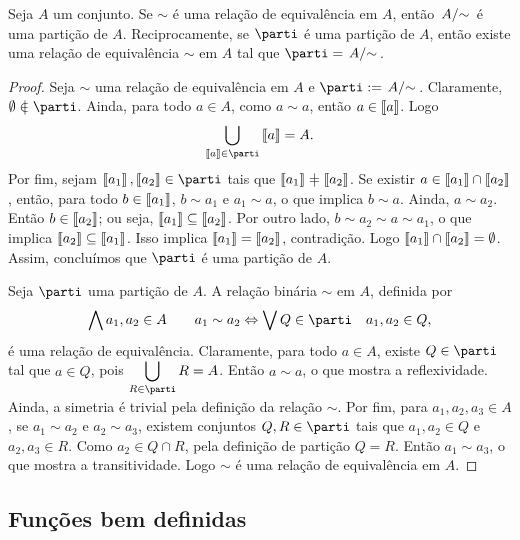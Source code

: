 \begin{theorem}
\label{conj:teo.rel.equiv.part}
	Seja $A$ um conjunto. Se $\sim$ é uma relação de equivalência em $A$, então $\quo{A}{\sim}$ é uma partição de $A$. Reciprocamente, se $\parti$ é uma partição de $A$, então existe uma relação de equivalência $\sim$ em $A$ tal que $\parti = \quo{A}{\sim}$.
\end{theorem}
\begin{proof}
Seja $\sim$ uma relação de equivalência em $A$ e $\parti := \quo{A}{\sim}$. Claramente, $\emptyset \notin \parti$. Ainda, para todo $a \in A$, como $a \sim a$, então $a \in \left\llbracket{a}\right\rrbracket$. Logo
	\begin{equation*}
	\bigcup_{\cla{a} \in \parti} \cla{a} = A.
	\end{equation*}
Por fim, sejam $\cla{a_1},\cla{a_2} \in \parti$ tais que $\cla{a_1} \neq \cla{a_2}$. Se existir $a \in \left\llbracket{a_1}\right\rrbracket \cap \left\llbracket{a_2}\right\rrbracket$, então, para todo $b \in \left\llbracket{a_1}\right\rrbracket$, $b \sim a_1$ e $a_1 \sim a$, o que implica $b \sim a$. Ainda, $a \sim a_2$. Então $b \in \left\llbracket{a_2}\right\rrbracket$; ou seja, $\left\llbracket{a_1}\right\rrbracket \subseteq \left\llbracket{a_2}\right\rrbracket$. Por outro lado, $b \sim a_2 \sim a \sim a_1$, o que implica $\left\llbracket{a_2}\right\rrbracket \subseteq \left\llbracket{a_1}\right\rrbracket$. Isso implica $\left\llbracket{a_1}\right\rrbracket=\left\llbracket{a_2}\right\rrbracket$, contradição. Logo $\left\llbracket{a_1}\right\rrbracket \cap \left\llbracket{a_2}\right\rrbracket=\emptyset$. Assim, concluímos que $\parti$ é uma partição de $A$.
	
Seja $\parti$ uma partição de $A$. A relação binária $\sim$ em $A$, definida por
	\begin{equation*}
	\forall a_1,a_2 \in A \qquad a_1 \sim a_2 \Leftrightarrow \exists Q \in \parti \quad a_1,a_2 \in Q,
	\end{equation*}
é uma relação de equivalência. Claramente, para todo $a \in A$, existe $Q \in \parti$ tal que $a \in Q$, pois $\displaystyle \bigcup_{R \in \parti} R = A$. Então $a \sim a$, o que mostra a reflexividade. Ainda, a simetria é trivial pela definição da relação $\sim$. Por fim, para $a_1,a_2,a_3 \in A$, se $a_1 \sim a_2$ e $a_2 \sim a_3$, existem conjuntos $Q,R \in \parti$ tais que $a_1,a_2 \in Q$ e $a_2,a_3 \in R$. Como $a_2 \in Q \cap R$, pela definição de partição $Q=R$. Então $a_1 \sim a_3$, o que mostra a transitividade. Logo $\sim$ é uma relação de equivalência em $A$.
\end{proof}

\subsection{Funções bem definidas}

